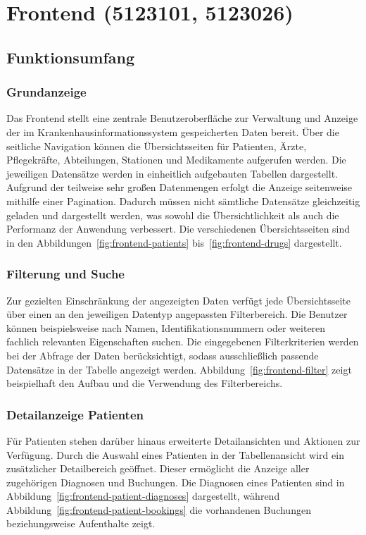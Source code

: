 \section{Frontend (5123101, 5123026)}

\subsection{Funktionsumfang}

\subsubsection{Grundanzeige}
Das Frontend stellt eine zentrale Benutzeroberfläche zur Verwaltung und Anzeige der im Krankenhausinformationssystem gespeicherten Daten bereit. Über die seitliche Navigation können die Übersichtsseiten für Patienten, Ärzte, Pflegekräfte, Abteilungen, Stationen und Medikamente aufgerufen werden. Die jeweiligen Datensätze werden in einheitlich aufgebauten Tabellen dargestellt. Aufgrund der teilweise sehr großen Datenmengen erfolgt die Anzeige seitenweise mithilfe einer Pagination. Dadurch müssen nicht sämtliche Datensätze gleichzeitig geladen und dargestellt werden, was sowohl die Übersichtlichkeit als auch die Performanz der Anwendung verbessert. Die verschiedenen Übersichtsseiten sind in den Abbildungen~\ref{fig:frontend-patients} bis~\ref{fig:frontend-drugs} dargestellt.

\subsubsection{Filterung und Suche}
Zur gezielten Einschränkung der angezeigten Daten verfügt jede Übersichtsseite über einen an den jeweiligen Datentyp angepassten Filterbereich. Die Benutzer können beispielsweise nach Namen, Identifikationsnummern oder weiteren fachlich relevanten Eigenschaften suchen. Die eingegebenen Filterkriterien werden bei der Abfrage der Daten berücksichtigt, sodass ausschließlich passende Datensätze in der Tabelle angezeigt werden. Abbildung~\ref{fig:frontend-filter} zeigt beispielhaft den Aufbau und die Verwendung des Filterbereichs.

\subsubsection{Detailanzeige Patienten}
Für Patienten stehen darüber hinaus erweiterte Detailansichten und Aktionen zur Verfügung. Durch die Auswahl eines Patienten in der Tabellenansicht wird ein zusätzlicher Detailbereich geöffnet. Dieser ermöglicht die Anzeige aller zugehörigen Diagnosen und Buchungen. Die Diagnosen eines Patienten sind in Abbildung~\ref{fig:frontend-patient-diagnoses} dargestellt, während Abbildung~\ref{fig:frontend-patient-bookings} die vorhandenen Buchungen beziehungsweise Aufenthalte zeigt.
